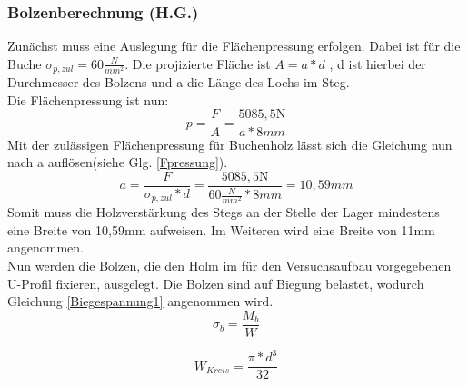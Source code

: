 

\subsubsection{Bolzenberechnung (H.G.)} \label{Bolzenberechnung}
Zunächst muss eine Auslegung für die Flächenpressung erfolgen. Dabei ist für die Buche $\sigma_{p,zul}=60\frac{N}{mm^2}$.
Die projizierte Fläche ist $A=a*d$ , d ist hierbei der Durchmesser des Bolzens und a die Länge des Lochs im Steg.\\
\noindent
Die Flächenpressung ist nun: 
\begin{equation}
	p=\frac{F}{A}=\frac{5085,5\mathrm{N}}{a*8mm}
\end{equation}
Mit der zulässigen Flächenpressung für Buchenholz lässt sich die Gleichung nun nach a auflösen(siehe Glg. \ref{Fpressung}).
\begin{equation}
\label{Fpressung}
	a=\frac{F}{\sigma_{p,zul}*d}=\frac{5085,5\mathrm{N}}{60\frac{N}{mm^{2}}*8mm}=10,59mm
\end{equation}
Somit muss die Holzverstärkung des Stegs an der Stelle der Lager mindestens eine Breite von 10,59$\mathrm{mm}$ aufweisen. Im Weiteren wird eine Breite von 11$\mathrm{mm}$ angenommen.\\
\noindent
Nun werden die Bolzen, die den Holm im für den Versuchsaufbau vorgegebenen U-Profil fixieren, ausgelegt. Die Bolzen sind auf Biegung belastet, wodurch Gleichung \ref{Biegespannung1} angenommen wird.
\begin{equation}
\label{Biegespannung1}
	\sigma_{b}=\frac{M_{b}}{W} 
\end{equation}
 
 \begin{equation}
 \label{WKreis}
 	W_{Kreis}=\frac{\pi*d^{3}}{32}
 \end{equation}
  
